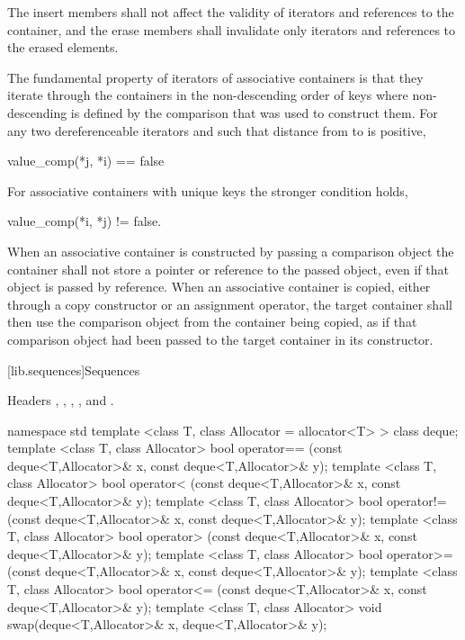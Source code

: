 \pnum
The insert members shall not affect the validity of
iterators and references to the container,
and the erase members shall invalidate only iterators and
references to the erased elements.

\pnum
The fundamental property of iterators of associative containers is that they iterate through the containers
in the non-descending order of keys where non-descending is defined by the comparison that was used to
construct them.
For any two dereferenceable iterators
and
such that distance from
to
is positive,

\begin{codeblock}
value_comp(*j, *i) == false
\end{codeblock}

\pnum
For associative containers with unique keys the stronger condition holds,

\begin{codeblock}
value_comp(*i, *j) != false.
\end{codeblock}

\pnum
When an associative container is constructed by passing a comparison object the
container shall not store a pointer or reference to the passed object,
even if that object is passed by reference.
When an associative container is copied, either through a copy constructor
or an assignment operator,
the target container shall then use the comparison object from the container
being copied,
as if that comparison object had been passed to the target container in
its constructor.

[lib.sequences]{Sequences}

\pnum
Headers , , , 
, and .

%

\begin{codeblock}
namespace std {
  template <class T, class Allocator = allocator<T> > class deque;
  template <class T, class Allocator>
    bool operator==
      (const deque<T,Allocator>& x, const deque<T,Allocator>& y);
  template <class T, class Allocator>
    bool operator<
      (const deque<T,Allocator>& x, const deque<T,Allocator>& y);
  template <class T, class Allocator>
    bool operator!=
      (const deque<T,Allocator>& x, const deque<T,Allocator>& y);
  template <class T, class Allocator>
    bool operator>
      (const deque<T,Allocator>& x, const deque<T,Allocator>& y);
  template <class T, class Allocator>
    bool operator>=
      (const deque<T,Allocator>& x, const deque<T,Allocator>& y);
  template <class T, class Allocator>
    bool operator<=
      (const deque<T,Allocator>& x, const deque<T,Allocator>& y);
  template <class T, class Allocator>
    void swap(deque<T,Allocator>& x, deque<T,Allocator>& y);
}
\end{codeblock}

